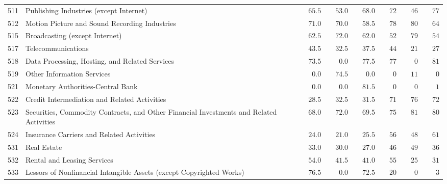 \documentclass[9pt, oneside]{article}   	%
\begin{document}
\begin{longtable}{lp{3in}cccccc}
511  & Publishing Industries (except Internet) & $\phantom{00}65.5$ & $\phantom{00}53.0$ & $\phantom{00}68.0$ & $\phantom{00}72$ & $\phantom{00}46$ & $\phantom{00}77$ \\
512  & Motion Picture and Sound Recording Industries & $\phantom{00}71.0$ & $\phantom{00}70.0$ & $\phantom{00}58.5$ & $\phantom{00}78$ & $\phantom{00}80$ & $\phantom{00}64$ \\
515  & Broadcasting (except Internet) & $\phantom{00}62.5$ & $\phantom{00}72.0$ & $\phantom{00}62.0$ & $\phantom{00}52$ & $\phantom{00}79$ & $\phantom{00}54$ \\
517  & Telecommunications & $\phantom{00}43.5$ & $\phantom{00}32.5$ & $\phantom{00}37.5$ & $\phantom{00}44$ & $\phantom{00}21$ & $\phantom{00}27$ \\
518  & Data Processing, Hosting, and Related Services & $\phantom{00}73.5$ & $\phantom{000}0.0$ & $\phantom{00}77.5$ & $\phantom{00}77$ & $\phantom{000}0$ & $\phantom{00}81$ \\
519  & Other Information Services & $\phantom{000}0.0$ & $\phantom{00}74.5$ & $\phantom{000}0.0$ & $\phantom{000}0$ & $\phantom{00}11$ & $\phantom{000}0$ \\
521  & Monetary Authorities-Central Bank & $\phantom{000}0.0$ & $\phantom{000}0.0$ & $\phantom{00}81.5$ & $\phantom{000}0$ & $\phantom{000}0$ & $\phantom{000}1$ \\
522  & Credit Intermediation and Related Activities & $\phantom{00}28.5$ & $\phantom{00}32.5$ & $\phantom{00}31.5$ & $\phantom{00}71$ & $\phantom{00}76$ & $\phantom{00}72$ \\
523  & Securities, Commodity Contracts, and Other Financial Investments and Related Activities & $\phantom{00}68.0$ & $\phantom{00}72.0$ & $\phantom{00}69.5$ & $\phantom{00}75$ & $\phantom{00}81$ & $\phantom{00}80$ \\
524  & Insurance Carriers and Related Activities & $\phantom{00}24.0$ & $\phantom{00}21.0$ & $\phantom{00}25.5$ & $\phantom{00}56$ & $\phantom{00}48$ & $\phantom{00}61$ \\
531  & Real Estate & $\phantom{00}33.0$ & $\phantom{00}30.0$ & $\phantom{00}27.0$ & $\phantom{00}46$ & $\phantom{00}49$ & $\phantom{00}36$ \\
532  & Rental and Leasing Services & $\phantom{00}54.0$ & $\phantom{00}41.5$ & $\phantom{00}41.0$ & $\phantom{00}55$ & $\phantom{00}25$ & $\phantom{00}31$ \\
533  & Lessors of Nonfinancial Intangible Assets (except Copyrighted Works) & $\phantom{00}76.5$ & $\phantom{000}0.0$ & $\phantom{00}72.5$ & $\phantom{00}20$ & $\phantom{000}0$ & $\phantom{000}3$ \\

\end{longtable}
\end{document}
